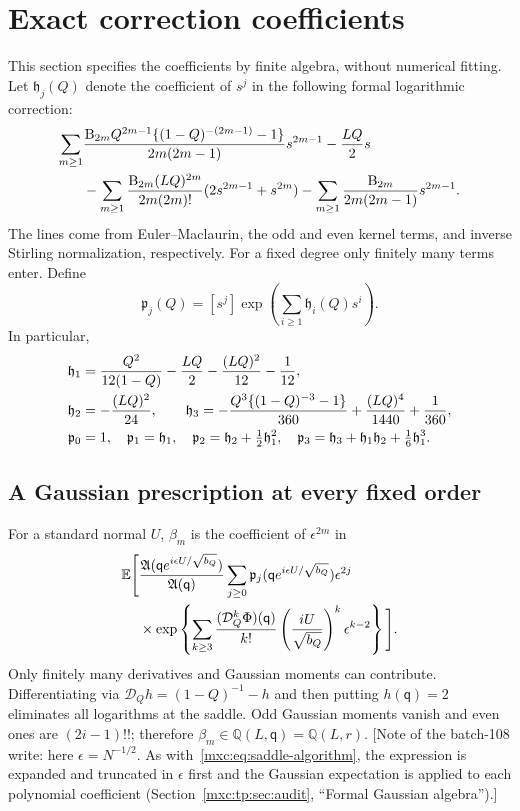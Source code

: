 \documentclass[11pt]{article}
\numberwithin{equation}{section}
\theoremstyle{definition}
\theoremstyle{remark}
\newcommand{\E}{\mathbb E}
\begin{document}
\section{Exact correction coefficients}\label{mxc:pm:sec:coefficients}
This section specifies the coefficients by finite algebra, without numerical
fitting. Let $\mathfrak h_j(Q)$ denote the coefficient of $s^j$ in the
following formal logarithmic correction:
\begin{align}\label{mxc:pm:eq:Hgeneral}
 \sum_{m\ge1}&\frac{\mathrm B_{2m}Q^{2m-1}\{(1-Q)^{-(2m-1)}-1\}}
                  {2m(2m-1)}s^{2m-1}
 -\frac{LQ}{2}s\notag\\
 &-\sum_{m\ge1}\frac{\mathrm B_{2m}(LQ)^{2m}}{2m(2m)!}
                  (2s^{2m-1}+s^{2m})
 -\sum_{m\ge1}\frac{\mathrm B_{2m}}{2m(2m-1)}s^{2m-1}.
\end{align}
The lines come from Euler--Maclaurin, the odd and even kernel terms, and
inverse Stirling normalization, respectively. For a fixed degree only
finitely many terms enter. Define
\[
 \mathfrak p_j(Q)=[s^j]\exp\left(\sum_{i\ge1}\mathfrak h_i(Q)s^i\right).
\]
In particular,
\begin{align}\label{mxc:pm:eq:H123}
 \mathfrak h_1&=\frac{Q^2}{12(1-Q)}-\frac{LQ}{2}
       -\frac{(LQ)^2}{12}-\frac1{12},\notag\\
 \mathfrak h_2&=-\frac{(LQ)^2}{24},\qquad
 \mathfrak h_3=-\frac{Q^3\{(1-Q)^{-3}-1\}}{360}
          +\frac{(LQ)^4}{1440}+\frac1{360},\\
 \mathfrak p_0&=1,\quad \mathfrak p_1=\mathfrak h_1,\quad
 \mathfrak p_2=\mathfrak h_2+\tfrac12\mathfrak h_1^2,
 \quad \mathfrak p_3=\mathfrak h_3+\mathfrak h_1\mathfrak h_2+\tfrac16\mathfrak h_1^3.\notag
\end{align}

\subsection{A Gaussian prescription at every fixed order}
For a standard normal $U$, $\beta_m$ is the coefficient of $\epsilon^{2m}$ in
\begin{align}\label{mxc:pm:eq:Gaussianformula}
 \E\Bigg[&\frac{\mathfrak A(\mathsf qe^{i\epsilon U/\sqrt{b_Q}})}{\mathfrak A(\mathsf q)}
 \sum_{j\ge0}\mathfrak p_j(\mathsf qe^{i\epsilon U/\sqrt{b_Q}})\epsilon^{2j}\notag\\
 &\times\exp\left\{\sum_{k\ge3}
 \frac{(\mathcal D_Q^k\Phi)(\mathsf q)}{k!}
       \left(\frac{iU}{\sqrt{b_Q}}\right)^k\epsilon^{k-2}\right\}\Bigg].
\end{align}
Only finitely many derivatives and Gaussian moments can contribute.
Differentiating via $\mathcal D_Qh=(1-Q)^{-1}-h$ and then putting
$h(\mathsf q)=2$ eliminates all logarithms at the saddle. Odd Gaussian moments
vanish and even ones are $(2i-1)!!$; therefore
$\beta_m\in\mathbb Q(L,\mathsf q)=\mathbb Q(L,r)$. [Note of the batch-108
write: here $\epsilon=N^{-1/2}$. As with~\eqref{mxc:eq:saddle-algorithm}, the
expression is expanded and truncated in $\epsilon$ first and the Gaussian
expectation is applied to each polynomial coefficient
(Section~\ref{mxc:tp:sec:audit}, ``Formal Gaussian algebra'').]
\end{document}
